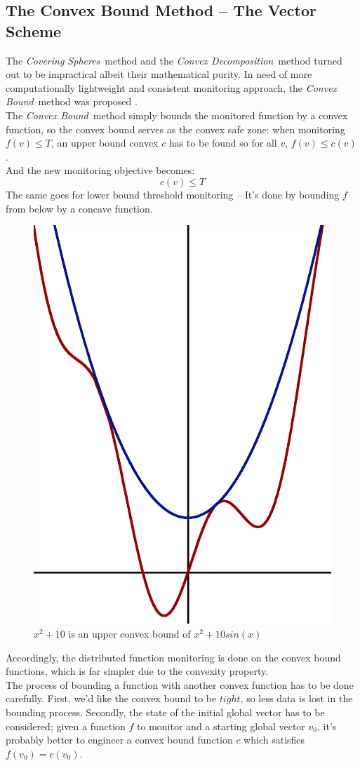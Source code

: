 \documentclass[10pt, conference]{IEEEtran}
\newcommand{\coveringSpheres}{\textit{Covering Spheres}}
\newcommand{\convexDecomposition}{\textit{Convex Decomposition}}
\newcommand{\convexBound}{\textit{Convex Bound}}
\begin{document}
\subsection{The Convex Bound Method -- The Vector Scheme}
The \coveringSpheres \ method and the \convexDecomposition \ method turned out to be impractical albeit their mathematical purity. In need of more computationally lightweight and consistent monitoring approach, the \convexBound \ method was proposed \cite{lazerson2018lightweight}. \\
The \convexBound \ method simply bounds the monitored function by a convex function, so the convex bound serves as the convex safe zone: when monitoring $f(v) \leq T$, an upper bound convex $c$ has to be found so for all $v$, $f(v) \leq  c(v)$. \\
And the new monitoring objective becomes:
\begin{equation}
\label{monitoringConstraint}
c(v) \leq T
\end{equation}
The same goes for lower bound threshold monitoring -- It's done by bounding $f$ from below by a concave function.
\begin{figure}[t]
\begin{center}
\includegraphics[width=0.3\linewidth]{Pics/PNGs/ConvexBound.png}
\end{center}
\caption{$x^2+10$ is an upper convex bound of $x^2+10sin(x)$}
\end{figure}
Accordingly, the distributed function monitoring is done on the convex bound functions, which is far simpler due to the convexity property. \\
The process of bounding a function with another convex function has to be done carefully. First, we'd like the convex bound to be $tight$, so less data is lost in the bounding process. Secondly, the state of the initial global vector has to be considered;
given a function $f$ to monitor and a starting global vector $v_0$, it's probably better to engineer a convex bound function $c$ which satisfies ${f(v_0)=c(v_0)}$. \\
\end{document}
